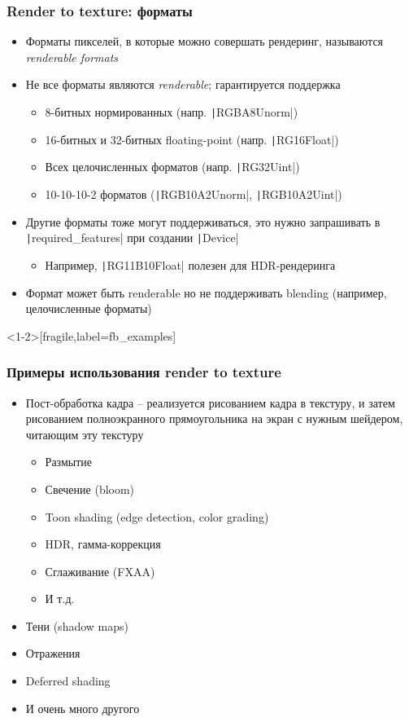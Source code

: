 \documentclass[10pt]{beamer}
\begin{document}
\begin{frame}[fragile]
\frametitle{Render to texture: форматы}
\begin{itemize}
\item Форматы пикселей, в которые можно совершать рендеринг, называются \textit{renderable formats}
\pause
\item Не все форматы являются \textit{renderable}; гарантируется поддержка
\pause
\begin{itemize}
\item 8-битных нормированных (напр. \texttt|RGBA8Unorm|)
\item 16-битных и 32-битных floating-point (напр. \texttt|RG16Float|)
\item Всех целочисленных форматов (напр. \texttt|RG32Uint|)
\item 10-10-10-2 форматов (\texttt|RGB10A2Unorm|, \texttt|RGB10A2Uint|)
\end{itemize}
\pause
\item Другие форматы тоже могут поддерживаться, это нужно запрашивать в \texttt|required_features| при создании \texttt|Device|
\pause
\begin{itemize}
\item Например, \texttt|RG11B10Float| полезен для HDR-рендеринга
\end{itemize}
\pause
\item Формат может быть renderable но не поддерживать blending (например, целочисленные форматы)
\end{itemize}
\end{frame}

\begin{frame}<1-2>[fragile,label=fb_examples]
\frametitle{Примеры использования render to texture}
\begin{itemize}
\item Пост-обработка кадра -- реализуется рисованием кадра в текстуру, и затем рисованием полноэкранного прямоугольника на экран с нужным шейдером, читающим эту текстуру
\pause
\begin{itemize}
\item Размытие
\pause
\item Свечение (bloom)
\pause
\item Toon shading (edge detection, color grading)
\pause
\item HDR, гамма-коррекция
\pause
\item Сглаживание (FXAA)
\pause
\item И т.д.
\end{itemize}
\pause
\item Тени (shadow maps)
\pause
\item Отражения
\pause
\item Deferred shading
\pause
\item И очень много другого
\end{itemize}
\end{frame}
\end{document}
